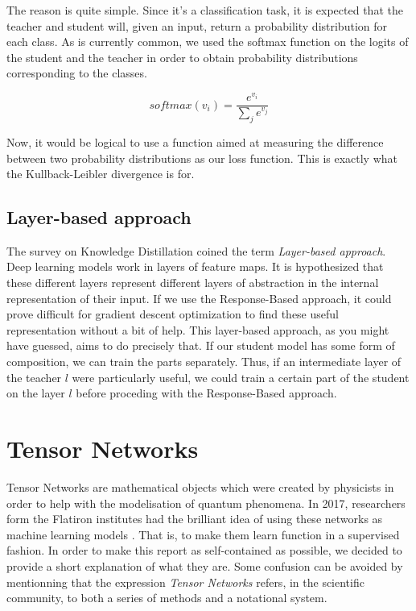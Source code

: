 \documentclass{article}
\theoremstyle{definition}
\theoremstyle{definition}
\begin{document}
The reason is quite simple. Since it's a classification task, it is expected that the teacher and student will, given an input, return a probability distribution for each class. As is currently common, we used the softmax function on the logits of the student and the teacher in order to obtain probability distributions corresponding to the classes. 

\begin{equation}
    softmax(v_i) = \frac{e^{v_i}}{\sum_{j}{e^{v_j}}}
\end{equation}

Now, it would be logical to use a function aimed at measuring the difference between two probability distributions as our loss function. This is exactly what the Kullback-Leibler divergence is for.

\subsection{Layer-based approach}
The survey on Knowledge Distillation coined the term {\it Layer-based approach}.
Deep learning models work in layers of feature maps. It is hypothesized that
these different layers represent different layers of abstraction in the internal
representation of their input. If we use the Response-Based approach, it could prove difficult for gradient descent optimization to find these useful representation without a bit of help. This layer-based approach, as you might have guessed, aims to do precisely that. If our student model has some form of composition, we can train the parts separately. Thus, if an intermediate layer of the teacher $l$ were particularly useful, we could train a certain part of the student on the layer $l$ before proceding with the Response-Based approach.



\section{Tensor Networks}
Tensor Networks are mathematical objects which were created by physicists in order to help with the modelisation of quantum phenomena.
In 2017, researchers form the Flatiron institutes had the brilliant idea of using these networks as machine learning models \cite{stoudenmire2017supervised}. That is, to make them learn function in a supervised fashion. In order to make this report as self-contained as possible, we decided to provide a short explanation of what they are. Some confusion can be avoided by mentionning that the expression \emph{Tensor Networks} refers, in the scientific community, to both a series of methods and a notational system.
\end{document}
